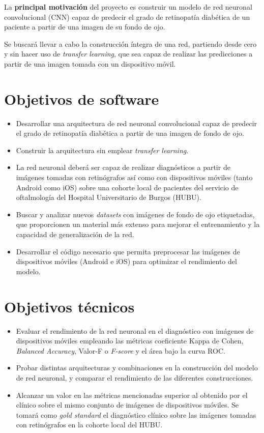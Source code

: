  \label{Obj}

La \textbf{principal motivación} del proyecto es construir un modelo de red neuronal convolucional (CNN) capaz de predecir el grado de retinopatía diabética de un paciente a partir de una imagen de su fondo de ojo.

Se buscará llevar a cabo la construcción íntegra de una red, partiendo desde cero y sin hacer uso de \textit{transfer learning}, que sea capaz de realizar las predicciones a partir de una imagen tomada con un dispositivo móvil.

\section{Objetivos de software}
\begin{itemize}[itemsep=0.25em]
    \item Desarrollar una arquitectura de red neuronal convolucional capaz de predecir el grado de retinopatía diabética a partir de una imagen de fondo de ojo.
    \item Construir la arquitectura sin emplear \textit{transfer learning}.
    \item La red neuronal deberá ser capaz de realizar diagnósticos a partir de imágenes tomadas con retinógrafos así como con dispositivos móviles (tanto Android como iOS) sobre una cohorte local de pacientes del servicio de oftalmología del Hospital Universitario de Burgos (HUBU).
    \item Buscar y analizar nuevos \textit{datasets} con imágenes de fondo de ojo etiquetadas, que proporcionen un material más extenso para mejorar el entrenamiento y la capacidad de generalización de la red.
    \item Desarrollar el código necesario que permita preprocesar las imágenes de dispositivos móviles (Android e iOS) para optimizar el rendimiento del modelo.
\end{itemize}

\section{Objetivos técnicos}
\begin{itemize}[itemsep=0.25em]
    \item Evaluar el rendimiento de la red neuronal en el diagnóstico con imágenes de dispositivos móviles empleando las métricas coeficiente Kappa de Cohen, \textit{Balanced Accuracy}, Valor-F o \textit{F-score} y el área bajo la curva ROC.
    \item Probar distintas arquitecturas y combinaciones en la construcción del modelo de red neuronal, y comparar el rendimiento de las diferentes construcciones. 
    \item Alcanzar un valor en las métricas mencionadas superior al obtenido por el clínico sobre el mismo conjunto de imágenes de dispositivos móviles. Se tomará como \textit{gold standard} el diagnóstico clínico sobre las imágenes tomadas con retinógrafos en la cohorte local del HUBU.
\end{itemize}

